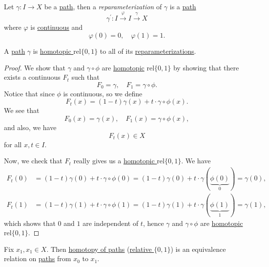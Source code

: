 \begin{definition}[Reparameterization]\label{def:reparameterization}
	Let \(\gamma\colon I\to X\) be a \hyperref[def:path]{path}, then a \emph{reparameterization} of \(\gamma\) is a \hyperref[def:path]{path}
	\[
		\gamma ^\prime \colon I\overset{\varphi }{\longrightarrow} I\overset{\gamma}{\longrightarrow} X
	\]
	where \(\varphi \) is \underline{continuous} and
	\[
		\varphi (0) = 0,\quad \varphi (1) = 1.
	\]
\end{definition}

\begin{exercise}
	A \hyperref[def:path]{path} \(\gamma\) is \hyperref[def:homotopy-relative]{homotopic \(\mathrm{rel} \{0, 1\}\)} to all of its
	\hyperref[def:reparameterization]{reparameterizations}.
\end{exercise}
\begin{proof}
	\par We show that \(\gamma\) and \(\gamma\circ \phi \) are \hyperref[def:homotopic]{homotopic} \(\mathrm{rel} \{0, 1\}\) by showing that
	there exists a continuous \(F_t\) such that
	\[
		F_0 = \gamma,\quad F_1 = \gamma\circ \phi.
	\]
	Notice that since \(\phi \) is continuous, so we define
	\[
		F_t(x) = (1 - t) \gamma(x) + t\cdot \gamma\circ \phi (x).
	\]
	We see that
	\[
		F_0(x) = \gamma(x),\quad F_1(x) = \gamma\circ \phi (x),
	\]
	and also, we have
	\[
		F_t(x)\in X
	\]
	for all \(x, t\in I\).

	\par Now, we check that \(F_t\) really gives us a \hyperref[def:homotopy-relative]{homotopic \(\mathrm{rel} \{0, 1\}\)}. We have
	\[
		\begin{split}
			F_t(0) &= (1 - t)\gamma(0) + t\cdot \gamma\circ \phi (0) = (1 - t)\gamma(0) + t\cdot \gamma(\underbrace{\phi (0)}_{0}) = \gamma(0),\\
			F_t(1) &= (1 - t)\gamma(1) + t\cdot \gamma\circ \phi (1) = (1 - t)\gamma(1) + t\cdot \gamma(\underbrace{\phi (1)}_{1}) = \gamma(1),
		\end{split}
	\]
	which shows that \(0\) and \(1\) are independent of \(t\), hence \(\gamma\) and \(\gamma\circ \phi \) are \hyperref[def:homotopy-relative]{homotopic \(\mathrm{rel} \{0, 1\}\)}.
\end{proof}

\begin{exercise}
	Fix \(x_1, x_1\in X\). Then \hyperref[def:homotopy-path]{\underline{homotopy of paths}} (\hyperref[def:homotopy-relative]{relative \(\{0, 1\}\)}) is an
	equivalence relation on \hyperref[def:path]{paths} from \(x_0\) to \(x_1\).
\end{exercise}

